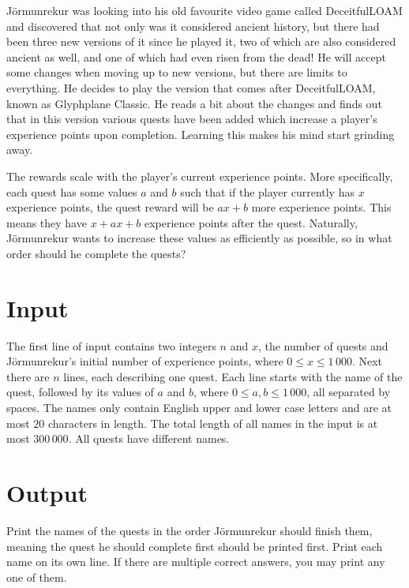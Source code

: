 
Jörmunrekur was looking into his old favourite video game called DeceitfulLOAM and discovered that not only was it considered ancient
history, but there had been three new versions of it since he played it, two of which are also considered ancient as well, and one of which had even
risen from the dead! He will accept some changes when moving up to new versions, but there are limits to everything. He decides to play
the version that comes after DeceitfulLOAM, known as Glyphplane Classic. He reads a bit about the changes and finds out that in this
version various quests have been added which increase a player's experience points upon completion. Learning this makes his mind
start grinding away.

The rewards scale with the player's current experience points. More specifically, each quest has some values $a$ and $b$ such that
if the player currently has $x$ experience points, the quest reward will be $ax + b$ more experience points. 
This means they have $x + ax + b$ experience points after the quest.
Naturally, Jörmunrekur wants to increase these values as efficiently as possible, so in what order should he complete the quests?

\section*{Input}
The first line of input contains two integers $n$ and $x$, the number of quests and Jörmunrekur's initial number of
experience points, where $0 \leq x \leq 1\,000$. Next there are $n$ lines, each describing one quest. Each line starts with the name of the quest, followed by its
values of $a$ and $b$, where $0 \leq a, b \leq 1\,000$, all separated by spaces. The names only contain English upper and lower case letters and are at most
$20$ characters in length. The total length of all names in the input is at most $300\,000$. All quests have different names.

\section*{Output}
Print the names of the quests in the order Jörmunrekur should finish them, meaning the quest he should complete first should be
printed first. Print each name on its own line. If there are multiple correct answers, you may print any one of them.

